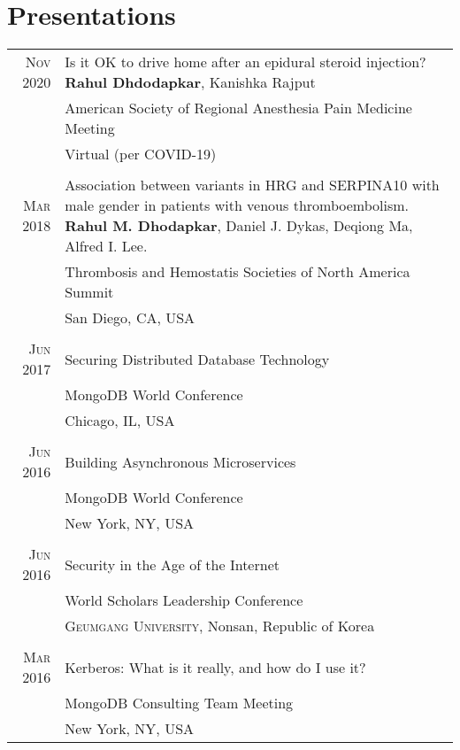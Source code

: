 \documentclass[a4paper,10pt]{article}
\begin{document}
\section{Presentations}
\begin{tabular}{rp{11cm}}
 \textsc{Nov} 2020 & Is it OK to drive home after an epidural steroid injection? {\bf Rahul Dhdodapkar}, Kanishka Rajput \\
 								 & American Society of Regional Anesthesia Pain Medicine Meeting \\
 								 & Virtual (per COVID-19)  \\
 \multicolumn{2}{c}{} \\
 \textsc{Mar} 2018 & Association between variants in HRG and SERPINA10 with male gender in patients with venous thromboembolism.
 {\bf Rahul M. Dhodapkar},  Daniel J. Dykas,  Deqiong Ma,  Alfred I. Lee. \\
 								 & Thrombosis and Hemostatis Societies of North America Summit \\
 								 & San Diego, CA, USA  \\
 \multicolumn{2}{c}{} \\
 \textsc{Jun} 2017 & Securing Distributed Database Technology \\
 								 & MongoDB World Conference\\
 								 & Chicago, IL, USA  \\
 \multicolumn{2}{c}{} \\
 \textsc{Jun} 2016 & Building Asynchronous Microservices \\
 								 & MongoDB World Conference\\
 								 & New York, NY, USA  \\
 \multicolumn{2}{c}{} \\
 \textsc{Jun} 2016 & Security in the Age of the Internet\\
 							    &  World Scholars Leadership Conference\\
 							    &  \textsc{Geumgang University}, Nonsan, Republic of Korea \\
 \multicolumn{2}{c}{} \\
 \textsc{Mar} 2016 & Kerberos: What is it really, and how do I use it?\\
 							    &  MongoDB Consulting Team Meeting\\
 							    &  New York, NY, USA \\
\end{tabular}
\end{document}
